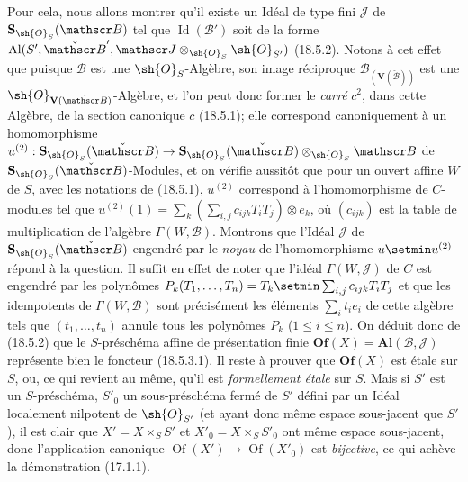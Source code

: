 Pour cela, nous allons montrer qu'il existe un Idéal de type fini $\mathscr J$ de $\mathbf S_{\sh{O}_S}(\mathscr B)$ tel que $\operatorname{Id}(\mathscr B')$ soit de la forme $\operatorname{Al}(S',\check{\mathscr B}',\mathscr J\otimes_{\sh{O}_S}\sh{O}_{S'})$ (18.5.2). Notons à cet effet que puisque $\mathscr B$ est une $\sh{O}_S$-Algèbre, son image réciproque $\mathscr B_{(\mathbf V(\check{\mathscr B}))}$ est une $\sh{O}_{\mathbf V(\check{\mathscr B})}$-Algèbre, et l'on peut donc former le \emph{carré} $c^2$, dans cette Algèbre, de la section canonique $c$ (18.5.1); elle correspond canoniquement à un homomorphisme $u^{(2)}:\mathbf S_{\sh{O}_S}(\check{\mathscr B})\to\mathbf S_{\sh{O}_S}(\check{\mathscr B})\otimes_{\sh{O}_S}\mathscr B$ de $\mathbf S_{\sh{O}_S}(\check{\mathscr B})$-Modules, et on vérifie aussitôt que pour un ouvert affine $W$ de $S$, avec les notations de (18.5.1), $u^{(2)}$ correspond à l'homomorphisme de $C$-modules tel que $u^{(2)}(1)=\sum_k(\sum_{i,j}c_{ijk}T_iT_j)\otimes e_k$, où $(c_{ijk})$ est la table de multiplication de l'algèbre $\Gamma(W,\mathscr B)$. Montrons que l'Idéal $\mathscr J$ de $\mathbf S_{\sh{O}_S}(\check{\mathscr B})$ engendré par le \emph{noyau} de l'homomorphisme $u\setmin u^{(2)}$ répond à la question. Il suffit en effet de noter que l'idéal $\Gamma(W,\mathscr J)$ de $C$ est engendré par les polynômes $P_k(T_1,\ldots,T_n)=T_k\setmin\sum_{i,j}c_{ijk}T_iT_j$ et que les idempotents de $\Gamma(W,\mathscr B)$ sont précisément les éléments $\sum_i t_i e_i$ de cette algèbre tels que $(t_1,\ldots,t_n)$ annule tous les polynômes $P_k$ ($1\leq i\leq n$). On déduit donc de (18.5.2) que le $S$-préschéma affine de présentation finie $\mathbf{Of}(X)=\mathbf{Al}(\mathscr B,\mathscr J)$ représente bien le foncteur (18.5.3.1). Il reste à prouver que $\mathbf{Of}(X)$ est étale sur $S$, ou, ce qui revient au même, qu'il est \emph{formellement étale} sur $S$. Mais si $S'$ est un $S$-préschéma, $S'_0$ un sous-préschéma fermé de $S'$ défini par un Idéal localement nilpotent de $\sh{O}_{S'}$ (et ayant donc même espace sous-jacent que $S'$), il est clair que $X'=X\times_S S'$ et $X'_0=X\times_S S'_0$ ont même espace sous-jacent, donc l'application canonique $\operatorname{Of}(X')\to\operatorname{Of}(X'_0)$ est \emph{bijective}, ce qui achève la démonstration (17.1.1).

